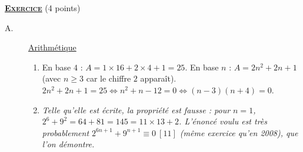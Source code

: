 \providecommand{\cm}{~\mathrm{cm}}
\providecommand{\Plan}{(\mathscr{P})}
\providecommand{\dx}{~\mathrm{d}x}
\providecommand{\dt}{\mathrm{d}t}
\providecommand{\Ouv}{(O;\vec{u},\vec{v})}
\providecommand{\mes}[2]{\mathrm{mes}\left( \widehat{ \overrightarrow{#1} ; \overrightarrow{#2} } \right)}
\providecommand{\D}{(\mathscr{D})}
\providecommand{\Courbe}{(\mathscr{C})}
\providecommand{\bary}[1]{\mathrm{bar}\left\lbrace #1 \right\rbrace}
\providecommand{\Angl}[2]{\left( \widehat{ \overrightarrow{#1} , \overrightarrow{#2} } \right)}
%
\noindent \underline{\textsc{\textbf{Exercice}}} (4 points)
\begin{description}
	\item[A.] \underline{Arithmétique}
	\begin{enumerate}
		\item {}
			En base $4$ : $A = 1 \times 16 + 2 \times 4 + 1 = 25$. En base $n$ : $A = 2n^2 + 2n + 1$ (avec $n \geq 3$ car le chiffre $2$ apparaît).
			$2n^2 + 2n + 1 = 25 \iff n^2 + n - 12 = 0 \iff (n - 3)(n + 4) = 0$.
			\par\noindent{}
		\item {}
			\textit{Telle qu'elle est écrite, la propriété est fausse : pour $n = 1$, $2^6 + 9^2 = 64 + 81 = 145 = 11 \times 13 + 2$.
			L'énoncé voulu est très probablement $2^{6n+1} + 9^{n+1} \equiv 0 \ [11]$ (même exercice qu'en 2008), que l'on démontre.}


\end{enumerate}
\end{description}
